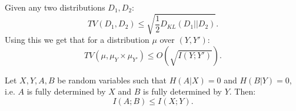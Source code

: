 \begin{lemma}
Given any two distributions $D_1,D_2$:
\[TV(D_1, D_2) \leq \sqrt{\frac{1}{2}D_{KL}(D_1 || D_2)}.\]
Using this we get that for a distribution $\mu$ over $(Y,Y')$:
\[TV(\mu, \mu_Y \times \mu_{Y'}) \leq O(\sqrt{I(Y;Y')}).\]
\end{lemma}

\begin{lemma}
Let $X,Y,A,B$ be random variables such that $H(A|X) = 0$ and $H(B|Y) = 0$, i.e. $A$ is fully determined by $X$ and $B$ is fully determined by $Y$. Then:
\[I(A;B) \leq I(X;Y).\]
\end{lemma}







